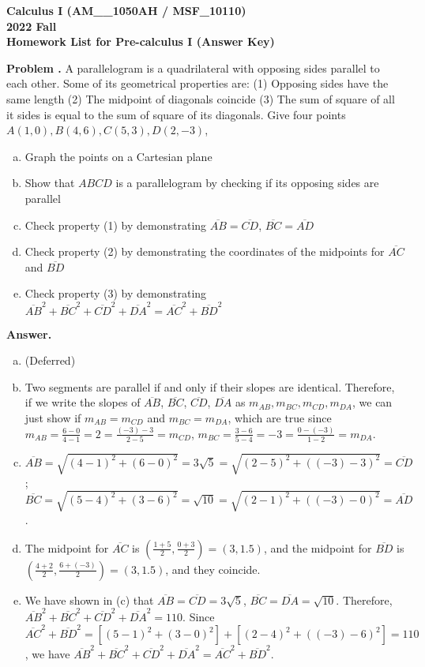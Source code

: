 \documentclass[11pt,letterpaper]{article}
\newcounter{problem}
\newcommand{\problem}{
	\stepcounter{problem}%
	\noindent \textbf{Problem \theproblem. }%
}
\newcommand{\answer}{\noindent \textbf{Answer. }}
\begin{document}
\noindent\textbf{\large Calculus I (AM\_\_1050AH / MSF\_10110) \\ 2022 Fall \\ Homework List for Pre-calculus I (Answer Key)}

\bigskip

\problem A parallelogram is a quadrilateral with opposing sides parallel to each other.  Some of its geometrical properties are: (1) Opposing sides have the same length (2) The midpoint of diagonals coincide (3) The sum of square of all it sides is equal to the sum of square of its diagonals. Give four points $A (1, 0), B (4, 6), C (5, 3), D (2, -3)$,
\begin{enumerate}[(a)]
    \item Graph the points on a Cartesian plane
    \item Show that $ABCD$ is a parallelogram by checking if its opposing sides are parallel
    \item Check property (1) by demonstrating $\overline{AB} = \overline{CD}$, $\overline{BC} = \overline{AD}$
    \item Check property (2) by demonstrating the coordinates of the midpoints for $\overline{AC}$ and $\overline{BD}$
    \item Check property (3) by demonstrating $\overline{AB}^2 + \overline{BC}^2 + \overline{CD}^2 + \overline{DA}^2 = \overline{AC}^2 + \overline{BD}^2$
\end{enumerate} \vspace{6mm}

\answer

\begin{enumerate}[(a)]
    \item (Deferred)
    \item Two segments are parallel if and only if their slopes are identical.  Therefore, if we write the slopes of $\overline{AB}$, $\overline{BC}$, $\overline{CD}$, $\overline{DA}$ as $m_{AB}, m_{BC}, m_{CD}, m_{DA}$, we can just show if $m_{AB} = m_{CD}$ and $m_{BC} = m_{DA}$, which are true since $m_{AB}=\frac{6-0}{4-1}=2=\frac{(-3)-3}{2-5}=m_{CD}$, $m_{BC}=\frac{3-6}{5-4}=-3=\frac{0-(-3)}{1-2}=m_{DA}$.
    \item $\overline{AB} = \sqrt{(4-1)^2+(6-0)^2} = 3\sqrt{5} = \sqrt{(2-5)^2+((-3)-3)^2} = \overline{CD}$; $\overline{BC} = \sqrt{(5-4)^2+(3-6)^2} = \sqrt{10} = \sqrt{(2-1)^2+((-3)-0)^2} = \overline{AD}$.
    \item The midpoint for $\overline{AC}$ is $\left(\frac{1+5}{2},\frac{0+3}{2}\right) = (3, 1.5)$, and the midpoint for $\overline{BD}$ is $\left(\frac{4+2}{2}, \frac{6+(-3)}{2}\right) = (3, 1.5)$, and they coincide.
    \item We have shown in (c) that $\overline{AB} = \overline{CD} = 3\sqrt{5}$, $\overline{BC} = \overline{DA} = \sqrt{10}$.  Therefore, $\overline{AB}^2 + \overline{BC}^2 + \overline{CD}^2 + \overline{DA}^2 = 110$.  Since $\overline{AC}^2 + \overline{BD}^2 = [(5-1)^2+(3-0)^2]+[(2-4)^2+((-3)-6)^2] = 110$, we have $\overline{AB}^2 + \overline{BC}^2 + \overline{CD}^2 + \overline{DA}^2 = \overline{AC}^2 + \overline{BD}^2$.
\end{enumerate} \vspace{6mm}
\end{document}
